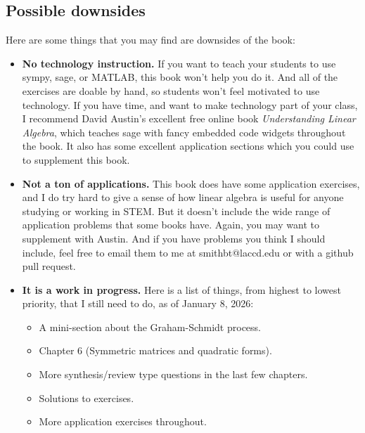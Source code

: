 \documentclass[11pt, letterpaper]{report}
\newcounter{exercise}[section]
\begin{document}
\subsection{Possible downsides}
Here are some things that you may find are downsides of the book:
\begin{itemize}
\item \textbf{No technology instruction.} If you want to teach your students to use sympy, sage, or MATLAB, this book won't help you do it. And all of the exercises are doable by hand, so students won't feel motivated to use technology. If you have time, and want to make technology part of your class, I recommend David Austin's excellent free online book \emph{Understanding Linear Algebra}, which teaches sage with fancy embedded code widgets throughout the book. It also has some excellent application sections which you could use to supplement this book.
\item \textbf{Not a ton of applications.} This book does have some application exercises, and I do try hard to give a sense of how linear algebra is useful for anyone studying or working in STEM. But it doesn't include the wide range of application problems that some books have. Again, you may want to supplement with Austin. And if you have problems you think I should include, feel free to email them to me at smithbt@laccd.edu or with a github pull request.
\item \textbf{It is a work in progress.} Here is a list of things, from highest to lowest priority, that I still need to do, as of January 8, 2026:
\begin{itemize}
\item A mini-section about the Graham-Schmidt process.
\item Chapter 6 (Symmetric matrices and quadratic forms).
\item More synthesis/review type questions in the last few chapters.
\item Solutions to exercises.
\item More application exercises throughout.
\end{itemize}
\end{itemize}
\end{document}
